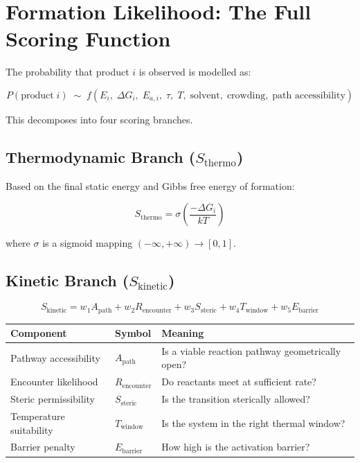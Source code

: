 \documentclass[11pt]{article}
\begin{document}
\section{Formation Likelihood: The Full Scoring Function}
\label{sec:scoring}

The probability that product $i$ is observed is modelled as:

\begin{equation}
\label{eq:formation_prob}
P(\text{product}\; i) \;\sim\;
f\!\left(E_i,\;\Delta G_i,\;E_{a,i},\;\tau,\;T,\;
\text{solvent},\;\text{crowding},\;\text{path accessibility}\right)
\end{equation}

This decomposes into four scoring branches.

\subsection{Thermodynamic Branch ($S_\text{thermo}$)}

Based on the final static energy and Gibbs free energy of formation:

\begin{equation}
S_\text{thermo} = \sigma\!\left(\frac{-\Delta G_i}{kT}\right)
\end{equation}

where $\sigma$ is a sigmoid mapping $(-\infty,+\infty) \to [0,1]$.

\subsection{Kinetic Branch ($S_\text{kinetic}$)}

\begin{equation}
\label{eq:skinetic}
S_\text{kinetic} = w_1 A_\text{path}
                 + w_2 R_\text{encounter}
                 + w_3 S_\text{steric}
                 + w_4 T_\text{window}
                 + w_5 E_\text{barrier}
\end{equation}

\begin{center}
\begin{tabular}{lll}
\toprule
Component & Symbol & Meaning \\
\midrule
Pathway accessibility     & $A_\text{path}$      & Is a viable reaction pathway geometrically open? \\
Encounter likelihood      & $R_\text{encounter}$  & Do reactants meet at sufficient rate? \\
Steric permissibility     & $S_\text{steric}$     & Is the transition sterically allowed? \\
Temperature suitability   & $T_\text{window}$     & Is the system in the right thermal window? \\
Barrier penalty           & $E_\text{barrier}$    & How high is the activation barrier? \\
\bottomrule
\end{tabular}
\end{center}
\end{document}
